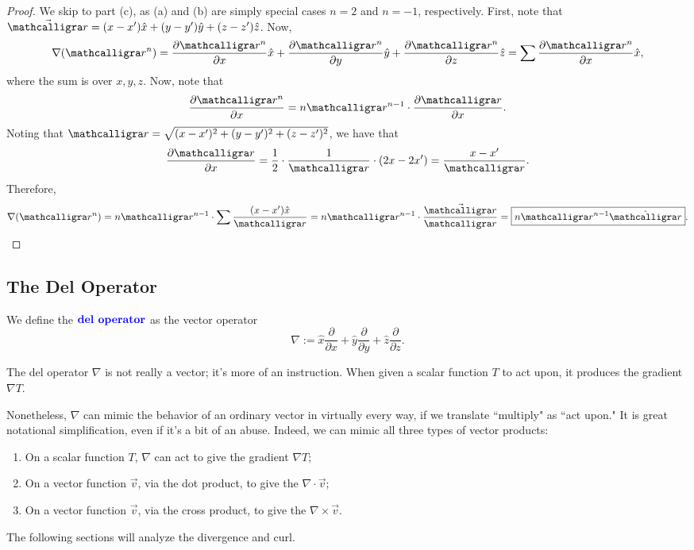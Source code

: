 \begin{proof}
We skip to part (c), as (a) and (b) are simply special cases $n=2$ and $n=-1$, respectively. First, note that $\vec{\scr}=(x-x')\hat{x}+(y-y')\hat{y}+(z-z')\hat{z}$. Now,
\[\nabla(\scr^n)=\frac{\partial \scr^n}{\partial x}\hat{x}+\frac{\partial \scr^n}{\partial y}\hat{y}+\frac{\partial \scr^n}{\partial z}\hat{z}=\sum \frac{\partial \scr^n}{\partial x}\hat{x},\]
where the sum is over $x,y,z$. Now, note that
\[\frac{\partial \scr^n}{\partial x}=n\scr^{n-1}\cdot\frac{\partial \scr}{\partial x}.\]
Noting that $\scr=\sqrt{(x-x')^2+(y-y')^2+(z-z')^2}$, we have that
\[\frac{\partial\scr}{\partial x}=\frac{1}{2}\cdot \frac{1}{\scr}\cdot (2x-2x')=\frac{x-x'}{\scr}.\]
Therefore,
\[\nabla(\scr^n)=n\scr^{n-1}\cdot \sum \frac{(x-x')\hat{x}}{\scr}=n\scr^{n-1}\cdot\frac{\vec{\scr}}{\scr}=\boxed{n\scr^{n-1}\hat{\scr}}.\]
\end{proof}


\subsection{The Del Operator}

\begin{definition}
We define the $\textbf{\color{blue} del operator}$ as the vector operator
\[\nabla:=\hat{x}\frac{\partial}{\partial x}+\hat{y}\frac{\partial}{\partial y}+\hat{z}\frac{\partial}{\partial z}.\]
\end{definition}

The del operator $\nabla$ is not really a vector; it's more of an instruction. When given a scalar function $T$ to act upon, it produces the gradient $\nabla T$.

Nonetheless, $\nabla$ can mimic the behavior of an ordinary vector in virtually every way, if we translate ``multiply" as ``act upon." It is great notational simplification, even if it's a bit of an abuse. Indeed, we can mimic all three types of vector products:

\begin{enumerate}
    \item On a scalar function $T$, $\nabla$ can act to give the gradient $\nabla T$;
    \item On a vector function $\vec{v}$, via the dot product, to give the  $\nabla\cdot \vec{v}$;
    \item On a vector function $\vec{v}$, via the cross product, to give the  $\nabla\times \vec{v}$.
\end{enumerate}
The following sections will analyze the divergence and curl.

